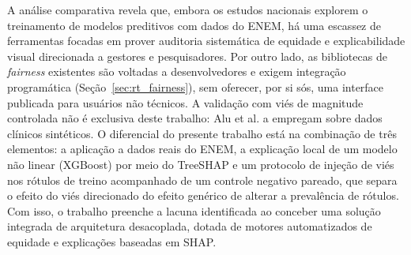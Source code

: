\begin{quadro}[htbp]
\centering
\caption{Comparativo analítico de trabalhos relacionados}
\label{qua:comparativo_trabalhos}
\end{quadro}

A análise comparativa revela que, embora os estudos nacionais explorem o treinamento de modelos preditivos com dados do ENEM, há uma escassez de ferramentas focadas em prover auditoria sistemática de equidade e explicabilidade visual direcionada a gestores e pesquisadores. Por outro lado, as bibliotecas de \textit{fairness} existentes são voltadas a desenvolvedores e exigem integração programática (Seção~\ref{sec:rt_fairness}), sem oferecer, por si sós, uma interface publicada para usuários não técnicos. A validação com viés de magnitude controlada não é exclusiva deste trabalho: Alu et al. \cite{alu2026auditing} a empregam sobre dados clínicos sintéticos. O diferencial do presente trabalho está na combinação de três elementos: a aplicação a dados reais do ENEM, a explicação local de um modelo não linear (XGBoost) por meio do TreeSHAP e um protocolo de injeção de viés nos rótulos de treino acompanhado de um controle negativo pareado, que separa o efeito do viés direcionado do efeito genérico de alterar a prevalência de rótulos. Com isso, o trabalho preenche a lacuna identificada ao conceber uma solução integrada de arquitetura desacoplada, dotada de motores automatizados de equidade e explicações baseadas em SHAP.